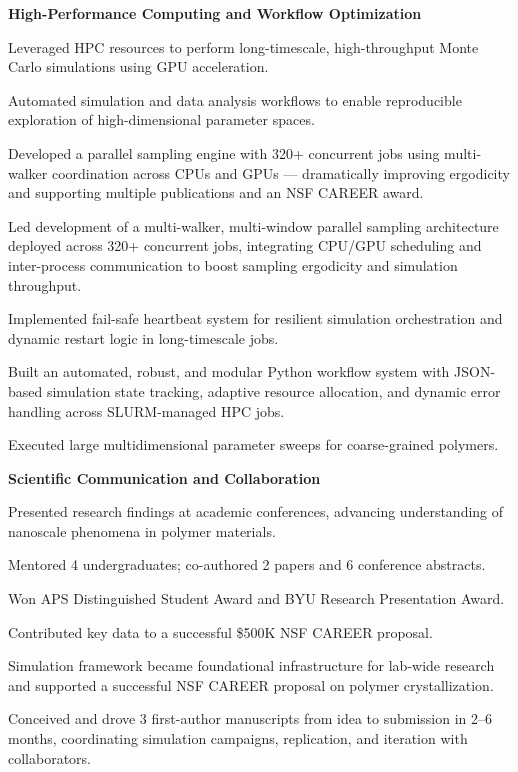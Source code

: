\documentclass[letterpaper,12pt]{article}
\begin{document}
\vspace{0.5em}
\textbf{High-Performance Computing and Workflow Optimization}
\begin{tabitemize}[leftmargin=*]
    \item Leveraged HPC resources to perform long-timescale, high-throughput Monte Carlo simulations using GPU acceleration.
    \item Automated simulation and data analysis workflows to enable reproducible exploration of high-dimensional parameter spaces.
    \item Developed a parallel sampling engine with 320+ concurrent jobs using multi-walker coordination across CPUs and GPUs — dramatically improving ergodicity and supporting multiple publications and an NSF CAREER award.
    \item Led development of a multi-walker, multi-window parallel sampling architecture deployed across 320+ concurrent jobs, integrating CPU/GPU scheduling and inter-process communication to boost sampling ergodicity and simulation throughput.
    \item Implemented fail-safe heartbeat system for resilient simulation orchestration and dynamic restart logic in long-timescale jobs.
    \item Built an automated, robust, and modular Python workflow system with JSON-based simulation state tracking, adaptive resource allocation, and dynamic error handling across SLURM-managed HPC jobs.
    \item Executed large multidimensional parameter sweeps for coarse-grained polymers.
\end{tabitemize}

\vspace{0.5em}
\textbf{Scientific Communication and Collaboration}
\begin{tabitemize}[leftmargin=*]
  \item Presented research findings at academic conferences, advancing understanding of nanoscale phenomena in polymer materials.
  \item Mentored 4 undergraduates; co-authored 2 papers and 6 conference abstracts.%
  \item Won APS Distinguished Student Award and BYU Research Presentation Award.
  \item Contributed key data to a successful \$500K NSF CAREER proposal.
  \item Simulation framework became foundational infrastructure for lab-wide research and supported a successful NSF CAREER proposal on polymer crystallization.
  \item Conceived and drove 3 first-author manuscripts from idea to submission in 2–6 months, coordinating simulation campaigns, replication, and iteration with collaborators.
\end{tabitemize}
\end{document}
